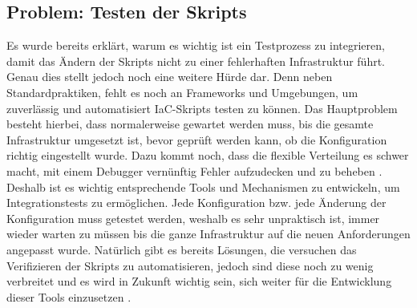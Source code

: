\documentclass[biblatex]{lni}
\begin{document}
\subsection{Problem: Testen der Skripts}
Es wurde bereits erklärt, warum es wichtig ist ein Testprozess zu integrieren, damit das Ändern der Skripts nicht zu einer fehlerhaften Infrastruktur führt. Genau dies stellt jedoch noch eine weitere Hürde dar. Denn neben Standardpraktiken, fehlt es noch an Frameworks und Umgebungen, um zuverlässig und automatisiert IaC-Skripts testen zu können. Das Hauptproblem besteht hierbei, dass normalerweise gewartet werden muss, bis die gesamte Infrastruktur umgesetzt ist, bevor geprüft werden kann, ob die Konfiguration richtig eingestellt wurde. Dazu kommt noch, dass die flexible Verteilung es schwer macht, mit einem Debugger vernünftig Fehler aufzudecken und zu beheben \cite[S. 580-587]{Guerriero.2019}.\\
Deshalb ist es wichtig entsprechende Tools und Mechanismen zu entwickeln, um Integrationstests zu ermöglichen. Jede Konfiguration bzw. jede Änderung der Konfiguration muss getestet werden, weshalb es sehr unpraktisch ist, immer wieder warten zu müssen bis die ganze Infrastruktur auf die neuen Anforderungen angepasst wurde. Natürlich gibt es bereits Lösungen, die versuchen das Verifizieren der Skripts zu automatisieren, jedoch sind diese noch zu wenig verbreitet und es wird in Zukunft wichtig sein, sich weiter für die Entwicklung dieser Tools einzusetzen \cite{Sokolowski.2022}.
\end{document}
